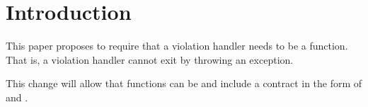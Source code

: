 \section{Introduction}

This paper proposes to require that a violation handler needs to be a
 function. That is, a violation handler cannot exit by throwing
an exception.

This change will allow that functions can be  and include a
contract in the form of  and .
